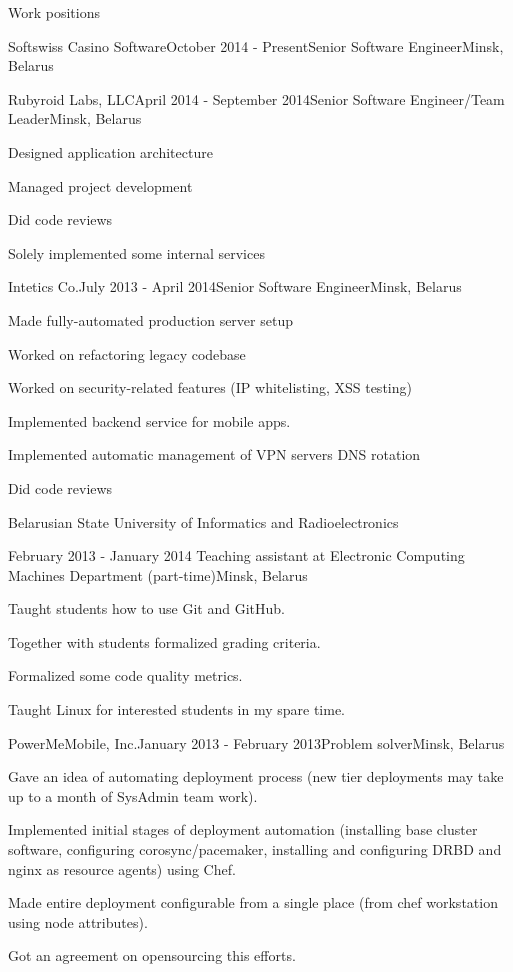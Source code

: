 \documentclass{resume} %
\begin{document}
\begin{rSection}{Work positions}

\begin{rSubsection}{Softswiss Casino Software}{October 2014 - Present}{Senior Software Engineer}{Minsk, Belarus}
~
\end{rSubsection}

\begin{rSubsection}{Rubyroid Labs, LLC}{April 2014 - September 2014}{Senior Software Engineer/Team Leader}{Minsk, Belarus}
\item Designed application architecture
\item Managed project development
\item Did code reviews
\item Solely implemented some internal services
\end{rSubsection}

\begin{rSubsection}{Intetics Co.}{July 2013 - April 2014}{Senior Software Engineer}{Minsk, Belarus}
\item Made fully-automated production server setup
\item Worked on refactoring legacy codebase
\item Worked on security-related features (IP whitelisting, XSS testing)
\item Implemented backend service for mobile apps.
\item Implemented automatic management of VPN servers DNS rotation
\item Did code reviews
\end{rSubsection}

\begin{rSubsection}{\parbox[t][2em][t]{9cm}{Belarusian State University of Informatics and Radioelectronics}}{February 2013 - January 2014 }{Teaching assistant at Electronic Computing Machines Department (part-time)}{Minsk, Belarus}
\item Taught students how to use Git and GitHub.
\item Together with students formalized grading criteria.
\item Formalized some code quality metrics.
\item Taught Linux for interested students in my spare time.
\end{rSubsection}

\begin{rSubsection}{PowerMeMobile, Inc.}{January 2013 - February 2013}{Problem solver}{Minsk, Belarus}
\item Gave an idea of automating deployment process (new tier deployments may take up to
  a month of SysAdmin team work).
\item Implemented initial stages of deployment automation (installing base cluster software,
  configuring corosync/pacemaker, installing and configuring DRBD and nginx as resource agents) using Chef.
\item Made entire deployment configurable from a single place (from chef workstation using node attributes).
\item Got an agreement on opensourcing this efforts.
\end{rSubsection}


\end{rSection}
\end{document}
